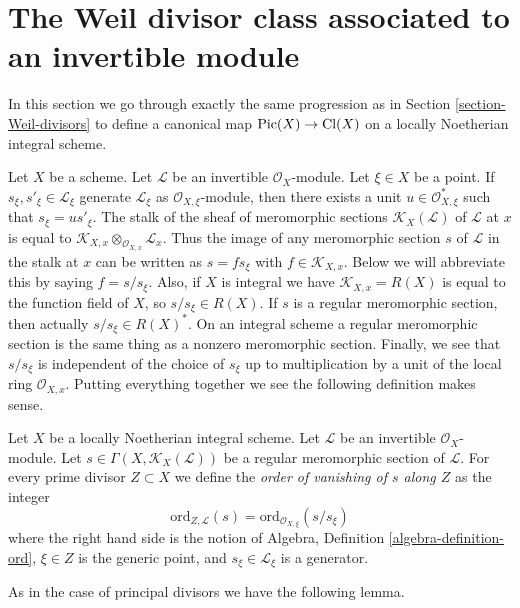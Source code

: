 \section{The Weil divisor class associated to an invertible module}
\label{section-c1}

\noindent
In this section we go through exactly the same progression as in
Section \ref{section-Weil-divisors} to define a canonical map
$\mathop{\mathrm{Pic}}\nolimits(X) \to \text{Cl}(X)$
on a locally Noetherian integral scheme.

\medskip\noindent
Let $X$ be a scheme. Let $\mathcal{L}$ be an invertible $\mathcal{O}_X$-module.
Let $\xi \in X$ be a point. If $s_\xi, s'_\xi \in \mathcal{L}_\xi$ generate
$\mathcal{L}_\xi$ as $\mathcal{O}_{X, \xi}$-module, then there exists a unit
$u \in \mathcal{O}_{X, \xi}^*$ such that $s_\xi = u s'_\xi$.
The stalk of the sheaf of meromorphic sections
$\mathcal{K}_X(\mathcal{L})$ of $\mathcal{L}$
at $x$ is equal to
$\mathcal{K}_{X, x} \otimes_{\mathcal{O}_{X, x}} \mathcal{L}_x$.
Thus the image of any meromorphic section $s$
of $\mathcal{L}$ in the stalk at $x$ can be written as $s = fs_\xi$ with
$f \in \mathcal{K}_{X, x}$. Below we will abbreviate this by
saying $f = s/s_\xi$. Also, if $X$ is integral we have
$\mathcal{K}_{X, x} = R(X)$ is equal to the function field of $X$,
so $s/s_\xi \in R(X)$. If $s$ is a regular meromorphic section,
then actually $s/s_\xi \in R(X)^*$. On an integral scheme a regular
meromorphic section is the same thing as a nonzero meromorphic section.
Finally, we see that $s/s_\xi$ is independent of the choice of $s_\xi$ up to
multiplication by a unit of the local ring $\mathcal{O}_{X, x}$.
Putting everything together we see the following definition makes sense.

\begin{definition}
\label{definition-order-vanishing-meromorphic}
Let $X$ be a locally Noetherian integral scheme.
Let $\mathcal{L}$ be an invertible $\mathcal{O}_X$-module.
Let $s \in \Gamma(X, \mathcal{K}_X(\mathcal{L}))$
be a regular meromorphic section of $\mathcal{L}$.
For every prime divisor $Z \subset X$ we define the
{\it order of vanishing of $s$ along $Z$} as the integer
$$
\text{ord}_{Z, \mathcal{L}}(s)
= \text{ord}_{\mathcal{O}_{X, \xi}}(s/s_\xi)
$$
where the right hand side is the notion of
Algebra, Definition \ref{algebra-definition-ord},
$\xi \in Z$ is the generic point,
and $s_\xi \in \mathcal{L}_\xi$ is a generator.
\end{definition}

\noindent
As in the case of principal divisors we have the following lemma.

